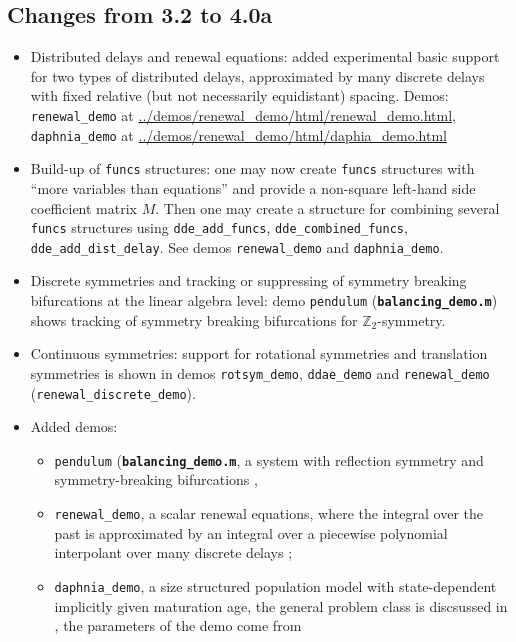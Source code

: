 \documentclass[10pt]{scrartcl}
\newcommand{\file}[1]{\textbf{\texttt{#1}}}
\newcommand{\blist}[1]{\mbox{\lstinline!#1!}}
\begin{document}
\subsection{Changes from 3.2 to 4.0a}
\label{sec:v32to4a}
\begin{itemize}
\item Distributed delays and renewal equations: added experimental basic support for two types of distributed delays,
  approximated by many discrete delays with fixed relative (but not necessarily
  equidistant) spacing. Demos: \blist{renewal_demo} at \url{../demos/renewal_demo/html/renewal_demo.html}, \blist{daphnia_demo} at \url{../demos/renewal_demo/html/daphia_demo.html}
\item Build-up of \blist{funcs} structures: one may now create \blist{funcs} structures with ``more
  variables than equations'' and provide a non-square left-hand side
  coefficient matrix $M$. Then one may create a structure for
  combining several \blist{funcs} structures using
  \blist{dde_add_funcs}, \blist{dde_combined_funcs},
  \blist{dde_add_dist_delay}. See demos \blist{renewal_demo} and
  \blist{daphnia_demo}.
\item Discrete symmetries and tracking or suppressing of symmetry
  breaking bifurcations at the linear algebra level: demo
  \blist{pendulum} (\file{balancing\_demo.m}) shows tracking of
  symmetry breaking bifurcations for $\mathbb{Z}_2$-symmetry.
\item Continuous symmetries: support for rotational symmetries and
  translation symmetries is shown in demos \blist{rotsym_demo},
  \blist{ddae_demo} and \blist{renewal_demo}
  (\blist{renewal_discrete_demo}).
\item Added demos:
  \begin{itemize}
  \item \blist{pendulum} (\file{balancing\_demo.m}, a
  system with reflection symmetry and symmetry-breaking bifurcations \cite{SK04},
\item \blist{renewal_demo}, a scalar renewal equations, where the
  integral over the past is approximated by an integral over a
  piecewise polynomial interpolant over many discrete delays \cite{breda2016numerical};
\item \blist{daphnia_demo}, a size structured population model with
  state-dependent implicitly given maturation age, the general problem
  class is discsussed in \cite{diekmann2010daphnia}, the parameters of
  the demo come from \cite{ando2020collocation}
\end{itemize}

\end{itemize}
\end{document}
